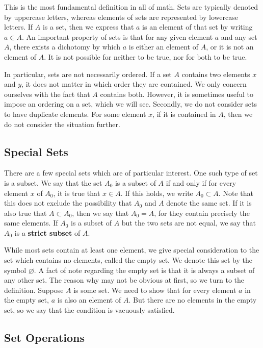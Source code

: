 \documentclass[12pt, titlepage]{article}
\begin{document}
This is the most fundamental definition in all of math. Sets are typically
denoted by uppercase letters, whereas elements of sets are represented by
lowercase letters. If \(A\) is a set, then we express that \(a\) is an element
of that set by writing \(a \in A\). An important property of sets is that for
any given element \(a\) and any set \(A\), there exists a dichotomy by which
\(a\) is either an element of \(A\), or it is not an element of \(A\). It is
not possible for neither to be true, nor for both to be true.

In particular, sets are not necessarily ordered. If a set \(A\) contains two
elements \(x\) and \(y\), it does not matter in which order they are contained.
We only concern ourselves with the fact that \(A\) contains both. However, it
is sometimes useful to impose an ordering on a set, which we will see.
Secondly, we do not consider sets to have duplicate elements. For some element
\(x\), if it is contained in \(A\), then we do not consider the situation
further.

\subsection{Special Sets}

There are a few special sets which are of particular interest. One such type of
set is a subset. We say that the set \(A_0\) is a subset of \(A\) if and only
if for every element \(x\) of \(A_0\), it is true that \(x \in A\). If this
holds, we write \(A_0 \subset A\). Note that this does not exclude the
possibility that \(A_0\) and \(A\) denote the same set. If it is also true that
\(A \subset A_0\), then we say that \(A_0 = A\), for they contain precisely the
same elements. If \(A_0\) is a subset of \(A\) but the two sets are not equal,
we say that \(A_0\) is a \textbf{strict subset} of \(A\).

While most sets contain at least one element, we give special consideration to
the set which contains no elements, called the empty set. We denote this set by
the symbol \(\varnothing\). A fact of note regarding the empty set is that it
is always a subset of any other set. The reason why may not be obvious at
first, so we turn to the definition. Suppose \(A\) is some set. We need to show
that for every element \(a\) in the empty set, \(a\) is also an element of
\(A\). But there are no elements in the empty set, so we say that the condition
is vacuously satisfied.

\subsection{Set Operations}
\end{document}
